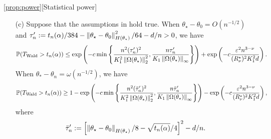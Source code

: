 \begin{customprop}{\ref{prop:power}}[Statistical power]
\begin{enumerate}
        \item[(c)] Suppose that the assumptions in  hold true.
        When $\theta_\star - \theta_0 = O(n^{-1/2})$ and $\tau_n' := t_n(\alpha)/384 - \left\lVert \theta_\star - \theta_0 \right\rVert_{H(\theta_\star)}^2/64 - d/n > 0$, we have
        \begin{align*}
            \operatorname{\mathbb P}(T_{\text{Wald}} > t_n(\alpha))
            \le \exp\left( -c\min\left\{ \frac{n^2 (\tau_n')^2}{K_1^2 \left\lVert \Omega(\theta_\star) \right\rVert_2^2}, \frac{n\tau_n'}{K_1 \left\lVert \Omega(\theta_\star) \right\rVert_\infty} \right\} \right) + \exp\left(-c \frac{\varepsilon^2 n^{3-\nu}}{(R_\nu^\star)^2 K_1^2 d} \right).
        \end{align*}
        When $\theta_* - \theta_n = \omega(n^{-1/2})$, we have
        \begin{align*}
            \operatorname{\mathbb P}(T_{\text{Wald}} > t_n(\alpha)) \ge 1 - \exp\left( -c\min\left\{ \frac{n^2 (\bar \tau_n')^2}{K_1^2 \left\lVert \Omega(\theta_\star) \right\rVert_2^2}, \frac{n\bar \tau_n'}{K_1 \left\lVert \Omega(\theta_\star) \right\rVert_\infty} \right\} \right) - \exp\left(-c \frac{\varepsilon^2 n^{3-\nu}}{(R_\nu^\star)^2 K_1^2 d} \right),
        \end{align*}
        where
        \begin{align*}
            \bar \tau_n' := \left[ \left\lVert \theta_\star - \theta_0 \right\rVert_{H(\theta_\star)}/8 - \sqrt{t_n(\alpha)}/4 \right]^2 - d/n.
        \end{align*}
    \end{enumerate}
\end{customprop}

